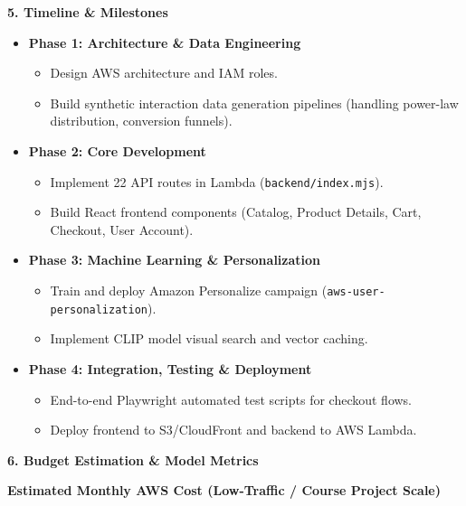 \vspace{0.5em}\noindent\textbf{5. Timeline \& Milestones}\par

\begin{itemize}
\tightlist
\item
  \textbf{Phase 1: Architecture \& Data Engineering}

  \begin{itemize}
  \tightlist
  \item
    Design AWS architecture and IAM roles.
  \item
    Build synthetic interaction data generation pipelines (handling
    power-law distribution, conversion funnels).
  \end{itemize}
\item
  \textbf{Phase 2: Core Development}

  \begin{itemize}
  \tightlist
  \item
    Implement 22 API routes in Lambda (\texttt{backend/index.mjs}).
  \item
    Build React frontend components (Catalog, Product Details, Cart,
    Checkout, User Account).
  \end{itemize}
\item
  \textbf{Phase 3: Machine Learning \& Personalization}

  \begin{itemize}
  \tightlist
  \item
    Train and deploy Amazon Personalize campaign
    (\texttt{aws-user-personalization}).
  \item
    Implement CLIP model visual search and vector caching.
  \end{itemize}
\item
  \textbf{Phase 4: Integration, Testing \& Deployment}

  \begin{itemize}
  \tightlist
  \item
    End-to-end Playwright automated test scripts for checkout flows.
  \item
    Deploy frontend to S3/CloudFront and backend to AWS Lambda.
  \end{itemize}
\end{itemize}

\vspace{0.5em}\noindent\textbf{6. Budget Estimation \& Model
Metrics}\par

\textbf{Estimated Monthly AWS Cost (Low-Traffic / Course Project Scale)}

